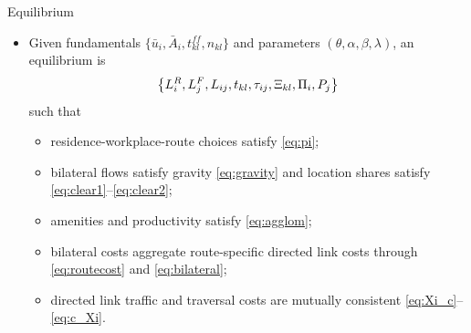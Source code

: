 \documentclass[11pt,aspectratio=169]{beamer}
\begin{document}
\begin{frame}[label=equilibrium]{Equilibrium}
\begin{itemize}\footnotesize\setlength\itemsep{0.65em}
  \item Given fundamentals $\{\bar u_i,\bar A_i,t_{kl}^{ff},n_{kl}\}$ and parameters $(\theta,\alpha,\beta,\lambda)$, an equilibrium is
  \vspace{-0.10em}\begin{equation}
    \left\{L_i^R,L_j^F,L_{ij},t_{kl},\tau_{ij},\Xi_{kl},\Pi_i,P_j\right\}
  \vspace{-0.25em}\end{equation}
  such that
  \begin{itemize}\footnotesize\setlength\itemsep{0.26em}
    \item residence-workplace-route choices satisfy \eqref{eq:pi};
    \item bilateral flows satisfy gravity \eqref{eq:gravity} and location shares satisfy \eqref{eq:clear1}--\eqref{eq:clear2};
    \item amenities and productivity satisfy \eqref{eq:agglom};
    \item bilateral costs aggregate route-specific directed link costs through \eqref{eq:routecost} and \eqref{eq:bilateral};
    \item directed link traffic and traversal costs are mutually consistent \eqref{eq:Xi_c}--\eqref{eq:c_Xi}.
  \end{itemize}
\end{itemize}
\end{frame}

\end{document}
